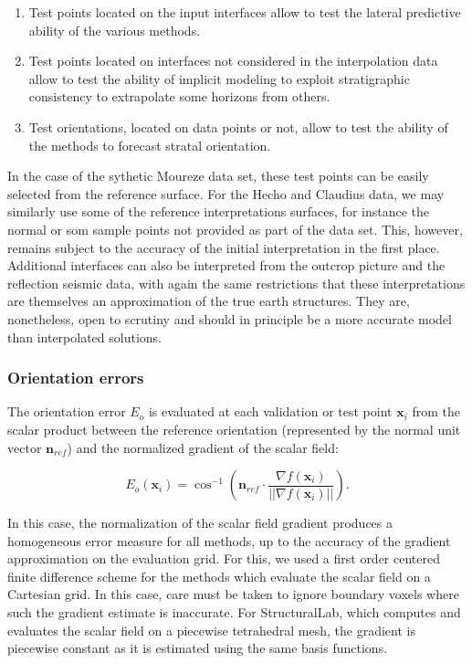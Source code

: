 \documentclass[preprint]{ring20}
\newcommand{\bx}{\mathbf{x}}
\newcommand{\bn}{\mathbf{n}}
\begin{document}
\begin{enumerate}
	\item Test points located on the input interfaces allow to test the lateral predictive ability of the various methods.  
  \item Test points located on interfaces not considered in the interpolation data allow to test the ability of implicit modeling to exploit stratigraphic consistency to extrapolate some horizons from others. 
  \item Test orientations, located on data points or not, allow to test the ability of the methods to forecast stratal orientation. 
\end{enumerate}

In the case of the sythetic Moureze data set, these test points can be easily selected from the reference surface. For the Hecho and Claudius data, we may similarly use some of the reference interpretations surfaces, for instance the normal or som sample points not provided as part of the data set. This, however, remains subject to the accuracy of the initial interpretation in the first place. Additional interfaces can also be interpreted from the outcrop picture and the reflection seismic data, with again the same restrictions that these interpretations are themselves an approximation of the true earth structures. They are, nonetheless, open to scrutiny and should in principle be a more accurate model than interpolated solutions.

\subsubsection{Orientation errors}

The orientation error $E_o$ is evaluated at each validation or test point $\bx_i$ from the scalar product between the reference orientation (represented by the normal unit vector $\bn_{ref}$) and the normalized gradient of the scalar field:

\begin{equation}
\label{eq:erro}
E_o(\bx_i) = \cos^{-1} \left( \bn_{ref} \cdot \frac{\nabla f(\bx_i)}{||\nabla f(\bx_i)||} \right).
\end{equation}

In this case, the normalization of the scalar field gradient produces a homogeneous error measure for all methods, up to the accuracy of the gradient approximation on the evaluation grid. For this, we used a first order centered finite difference scheme for the methods which evaluate the scalar field on a Cartesian grid. In this case, care must be taken to ignore boundary voxels where such the gradient estimate is inaccurate. For StructuralLab, which computes and evaluates the scalar field on a piecewise tetrahedral mesh, the gradient is piecewise constant as it is estimated using the same basis functions. 
\end{document}
